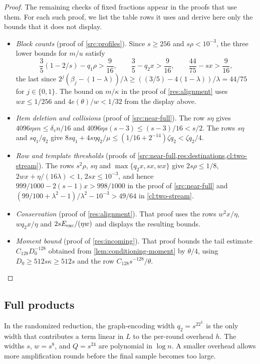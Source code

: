 \documentclass[11pt,letterpaper]{article} \usepackage[utf8]{inputenc}
\theoremstyle{plain} \newtheorem{theorem}{Theorem}[section]
\theoremstyle{definition} \newaliascnt{definition}{theorem}
\begin{document}
\begin{proof}
The remaining checks of fixed fractions appear in the proofs that use them.
For each such proof, we list the table rows it uses and derive here only the
bounds that it does not display.
\begin{itemize}
\item \emph{Block counts} (proof of \cref{src:profiles}). Since $s\ge256$
and $s\rho<10^{-3}$, the three lower bounds for $m/u$ satisfy
\[
\frac35(1-2/s)-q_1\rho>\frac9{16},\qquad
\frac35-q_2x>\frac9{16},\qquad
\frac{44}{75}-sx>\frac9{16},
\]
the last since $2^j(\beta_j-(1-\lambda))/\lambda\ge((3/5)-4(1-\lambda))/\lambda=44/75$
for $j\in\{0,1\}$. The bound on $m/\kappa$ in the
proof of \cref{res:alignment} uses $wx\le1/256$ and $4e(\theta)/w<1/32$
from the display above.
\item \emph{Item deletion and collisions} (proof of \cref{src:near-full}).
The row $s\eta$ gives $4096\eta sn\le\delta_v n/16$ and
$4096\eta s(s-3)\le(s-3)/16<s/2$. The rows $s\eta$ and $sq_1/q_2$ give
$8sq_1+4s\eta q_2/\mu\le(1/16+2^{-14})\zeta q_2<\zeta q_2/4$.
\item \emph{Row and template thresholds} (proofs of
\cref{src:near-full,res:destinations,cl:two-stream}). The rows $s^2\rho$, $s\eta$
and $\max\{q_2x,sx,wx\}$ give $2s\rho\le1/8$, $2wx+\eta/(16\lambda)<1$,
$2sx\le10^{-3}$, and hence $999/1000-2(s-1)x>998/1000$ in the proof of
\cref{src:near-full} and
$(99/100+\lambda^2-1)/\lambda^2-10^{-3}>49/64$ in \cref{cl:two-stream}.
\item \emph{Conservation} (proof of \cref{res:alignment}). That proof uses
the rows $w^2x/\eta$, $wq_2x/\eta$ and $2sE_{\rm exc}/(\eta w)$ and displays
the resulting bounds.
\item \emph{Moment bound} (proof of \cref{res:incoming}). That proof
bounds the tail estimate $C_{128}D_0^{-128}$ obtained from \cref{lem:conditioning-moment}
by $\theta/4$, using $D_0\ge512s\kappa\ge512s$ and the row $C_{128}s^{-128}/\theta$.
\end{itemize}
\end{proof}

\subsection{Full products}

In the randomized reduction, the graph-encoding width $q_2=s^22^L$ is the only
width that contributes a term linear in $L$ to the per-round overhead $h$. The widths
$s$, $w=s^8$, and $Q=s^{24}$ are polynomial in $\log n$. A smaller overhead allows more
amplification rounds before the final sample becomes too large.
\end{document}
